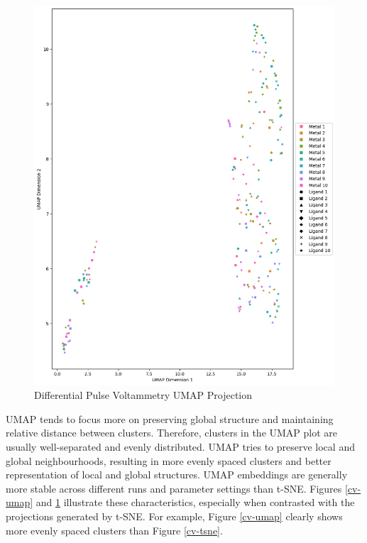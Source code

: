 \begin{figure}[h!]
  \centering
    \includegraphics[width=1.0\textwidth]{figures/dpv_umap.png}
    \caption{Differential Pulse Voltammetry UMAP Projection}
    \label{dpv-umap}
\end{figure}
UMAP tends to focus more on preserving global structure and maintaining relative distance between clusters. Therefore, clusters in the UMAP plot are usually well-separated and evenly distributed. UMAP tries to preserve local and global neighbourhoods, resulting in more evenly spaced clusters and better representation of local and global structures. UMAP embeddings are generally more stable across different runs and parameter settings than t-SNE. Figures \ref{cv-umap} and \ref{dpv-umap} illustrate these characteristics, especially when contrasted with the projections generated by t-SNE. For example, Figure \ref{cv-umap} clearly shows more evenly spaced clusters than Figure \ref{cv-tsne}.

